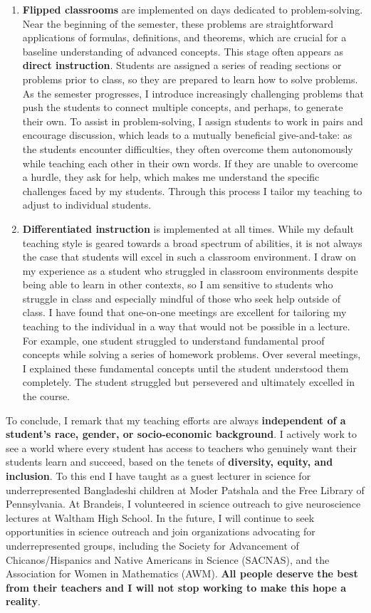 \documentclass[a4paper,11pt]{article}
\begin{document}
\begin{enumerate}
	\item \textbf{Flipped classrooms} are implemented on days dedicated to problem-solving. Near the beginning of the semester, these problems are straightforward applications of formulas, definitions, and theorems, which are crucial for a baseline understanding of advanced concepts. This stage often appears as \textbf{direct instruction}. Students are assigned a series of reading sections or problems prior to class, so they are prepared to learn how to solve problems. As the semester progresses, I introduce increasingly challenging problems that push the students to connect multiple concepts, and perhaps, to generate their own. To assist in problem-solving, I assign students to work in pairs and encourage discussion, which leads to a mutually beneficial give-and-take: as the students encounter difficulties, they often overcome them autonomously while teaching each other in their own words. If they are unable to overcome a hurdle, they ask for help, which makes me understand the specific challenges faced by my students. Through this process I tailor my teaching to adjust to individual students. 
	
	\item \textbf{Differentiated instruction} is implemented at all times. While my default teaching style is geared towards a broad spectrum of abilities, it is not always the case that students will excel in such a classroom environment. I draw on my experience as a student who struggled in classroom environments despite being able to learn in other contexts, so I am sensitive to students who struggle in class and especially mindful of those who seek help outside of class. I have found that one-on-one meetings are excellent for tailoring my teaching to the individual in a way that would not be possible in a lecture. For example, one student struggled to understand fundamental proof concepts while solving a series of homework problems. Over several meetings, I explained these fundamental concepts until the student understood them completely. The student struggled but persevered and ultimately excelled in the course.
\end{enumerate}

To conclude, I remark that my teaching efforts are always \textbf{independent of a student's race, gender, or socio-economic background}. I actively work to see a world where every student has access to teachers who genuinely want their students learn and succeed, based on the tenets of \textbf{diversity, equity, and inclusion}. To this end I have taught as a guest lecturer in science for underrepresented Bangladeshi children at Moder Patshala and the Free Library of Pennsylvania. At Brandeis, I volunteered in science outreach to give neuroscience lectures at Waltham High School. In the future, I will continue to seek opportunities in science outreach and join organizations advocating for underrepresented groups, including the Society for Advancement of Chicanos/Hispanics and Native Americans in Science (SACNAS), and the Association for Women in Mathematics (AWM). \textbf{All people deserve the best from their teachers and I will not stop working to make this hope a reality}.

\newpage
 
\end{document}
